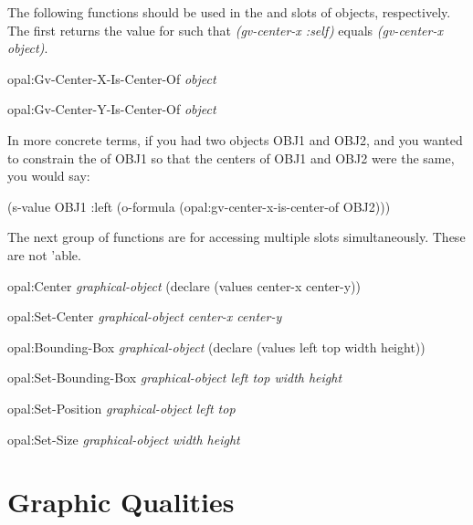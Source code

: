 \begin{group}
The following functions should be used in the  and  slots
of objects, respectively.  The first returns the value for  such
that {\it (gv-center-x :self)} equals {\it (gv-center-x object)}.

\begin{programexample}
opal:Gv-Center-X-Is-Center-Of {\it object}\value{function}

opal:Gv-Center-Y-Is-Center-Of {\it object}\value{function}
\end{programexample}

In more concrete terms, if you had two objects OBJ1 and OBJ2, and
you wanted to constrain the  of OBJ1 so that the centers of
OBJ1 and OBJ2 were the same, you would say:

\begin{programexample}
(s-value OBJ1 :left (o-formula (opal:gv-center-x-is-center-of OBJ2)))
\end{programexample}
\end{group}

\begin{group}
The next group of functions are for accessing multiple slots
simultaneously.  These are not 'able.

   
\begin{programexample}
opal:Center {\it graphical-object}\value{function}
  (declare (values center-x center-y))

opal:Set-Center {\it graphical-object center-x center-y}\value{function}

opal:Bounding-Box {\it graphical-object}\value{function}
  (declare (values left top width height))

opal:Set-Bounding-Box {\it graphical-object left top width height}\value{function}

opal:Set-Position {\it graphical-object left top}\value{function}

opal:Set-Size {\it graphical-object width height}\value{function}
\end{programexample}
\end{group}



\chapter{Graphic Qualities}
\label{GraphicQualities}

